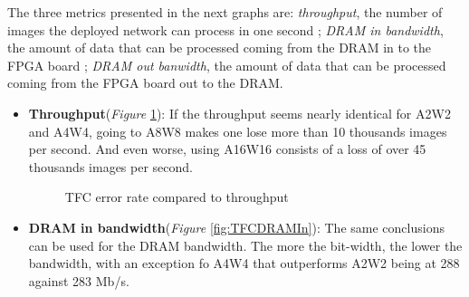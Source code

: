 The three metrics presented in the next graphs are: \emph{throughput}, the number of images the deployed network can process in one second ; \emph{DRAM in bandwidth}, the amount of data that can be processed coming from the DRAM in to the FPGA board ; \emph{DRAM out banwidth}, the amount of data that can be processed coming from the FPGA board out to the DRAM.

\begin{itemize}
  \item \textbf{Throughput}(\emph{Figure} \ref{fig:TFCThroughput}): If the throughput seems nearly identical for A2W2 and A4W4, going to A8W8 makes one lose more than 10 thousands images per second. And even worse, using A16W16 consists of a loss of over 45 thousands images per second.

  \begin{figure}[htbp]
  \centering
  \caption[TFC Throughput]{TFC error rate compared to throughput}
    \label{fig:TFCThroughput}
  \end{figure}


  \item \textbf{DRAM in bandwidth}(\emph{Figure} \ref{fig:TFCDRAMIn}): The same conclusions can be used for the DRAM bandwidth. The more the bit-width, the lower the bandwidth, with an exception fo A4W4 that outperforms A2W2 being at 288 against 283 Mb/s.


\end{itemize}
